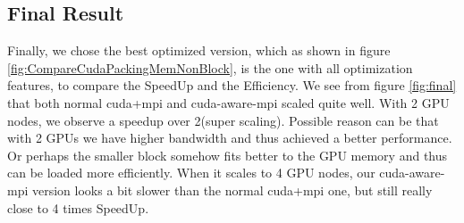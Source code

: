 \documentclass[article]{scrartcl}
\begin{document}
\subsection{Final Result}
Finally, we chose the best optimized version, which as shown in figure \ref{fig:CompareCudaPackingMemNonBlock},
is the one with all optimization features, to compare the SpeedUp and the Efficiency.
We see from figure \ref{fig:final} that both normal cuda+mpi and cuda-aware-mpi scaled quite well. With 2 GPU nodes, we observe a speedup over 2(super scaling).
Possible reason can be that with 2 GPUs we have higher bandwidth and thus achieved a better performance. Or perhaps the smaller block somehow fits better to the GPU memory and thus can be loaded more efficiently.
When it scales to 4 GPU nodes, our cuda-aware-mpi version looks a bit slower than the normal cuda+mpi one, but still really close to 4 times SpeedUp.
\end{document}
